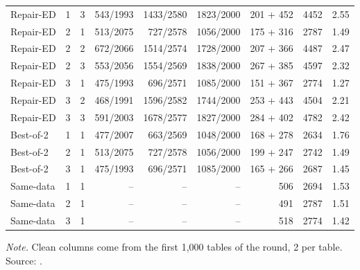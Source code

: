 {\begin{longtable}{@{}lccrrrrrr@{}}
Repair-ED & 1 & 3 & 543/1993 & 1433/2580 & 1823/2000 & 201 + 452 & 4452 & 2.55\\
Repair-ED & 2 & 1 & 513/2075 & 727/2578 & 1056/2000 & 175 + 316 & 2787 & 1.49\\
Repair-ED & 2 & 2 & 672/2066 & 1514/2574 & 1728/2000 & 207 + 366 & 4487 & 2.47\\
Repair-ED & 2 & 3 & 553/2056 & 1554/2569 & 1838/2000 & 267 + 385 & 4597 & 2.32\\
Repair-ED & 3 & 1 & 475/1993 & 696/2571 & 1085/2000 & 151 + 367 & 2774 & 1.27\\
Repair-ED & 3 & 2 & 468/1991 & 1596/2582 & 1744/2000 & 253 + 443 & 4504 & 2.21\\
Repair-ED & 3 & 3 & 591/2003 & 1678/2577 & 1827/2000 & 284 + 402 & 4782 & 2.42\\
Best-of-2 & 1 & 1 & 477/2007 & 663/2569 & 1048/2000 & 168 + 278 & 2634 & 1.76\\
Best-of-2 & 2 & 1 & 513/2075 & 727/2578 & 1056/2000 & 199 + 247 & 2742 & 1.49\\
Best-of-2 & 3 & 1 & 475/1993 & 696/2571 & 1085/2000 & 165 + 266 & 2687 & 1.45\\
Same-data & 1 & 1 & -- & -- & -- & 506 & 2694 & 1.53\\
Same-data & 2 & 1 & -- & -- & -- & 491 & 2787 & 1.51\\
Same-data & 3 & 1 & -- & -- & -- & 518 & 2774 & 1.42\\
\end{longtable}
}
\vspace{-0.6\baselineskip}
{\footnotesize\color{slate}\textit{Note.} Clean columns come from the first 1,000 tables of the round, 2 per table. Source: .\par}
\medskip

